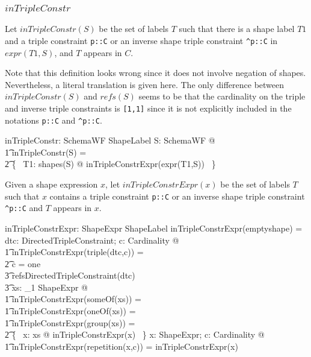 \documentclass{article}
\begin{document}
\subsubsection{$inTripleConstr$}
Let $inTripleConstr(S)$ be the set of labels $T$ such that there is a shape label $T1$ and a triple constraint 
{\tt p::C} or an inverse shape triple constraint
{\tt \verb+^+p::C} in $expr(T1, S)$, and $T$ appears in $C$.

Note that this definition looks wrong since it does not involve negation of shapes.
Nevertheless, a literal translation is given here.
The only difference between $inTripleConstr(S)$ and $refs(S)$ seems to be that the cardinality on the triple and inverse triple
constraints is {\tt [1,1]} since it is not explicitly included in the notations {\tt p::C} and {\tt \verb+^+p::C}.
\begin{axdef}
	inTripleConstr: SchemaWF \fun \finset ShapeLabel
\where
	\forall S: SchemaWF @ \\
\t1		inTripleConstr(S) = \\
\t2			\bigcup \{~ T1: shapes(S) @ inTripleConstrExpr(expr(T1,S)) ~\}
\end{axdef}

Given a shape expression $x$, let $inTripleConstrExpr(x)$ be the set of labels $T$ such that $x$ contains a triple constraint 
{\tt p::C} or an inverse shape triple constraint {\tt \verb+^+p::C} and $T$ appears in $x$.
\begin{axdef}
	inTripleConstrExpr: ShapeExpr \fun \finset ShapeLabel
\where
	inTripleConstrExpr(emptyshape) = \emptyset
\also
	\forall dtc: DirectedTripleConstraint; c: Cardinality @ \\
\t1		inTripleConstrExpr(triple(dtc,c)) = \\
\t2			\IF c = one \\
\t3				\THEN refsDirectedTripleConstraint(dtc) \\
\t3				\ELSE \emptyset
\also
	\forall xs: \seq_1 ShapeExpr @ \\
\t1		inTripleConstrExpr(someOf(xs)) = \\
\t1		inTripleConstrExpr(oneOf(xs)) = \\
\t1		inTripleConstrExpr(group(xs)) = \\
\t2			\bigcup \{~ x: \ran xs @ inTripleConstrExpr(x) ~\}
\also
	\forall x: ShapeExpr; c: Cardinality @ \\
\t1		inTripleConstrExpr(repetition(x,c)) = inTripleConstrExpr(x)
\end{axdef}
\end{document}
